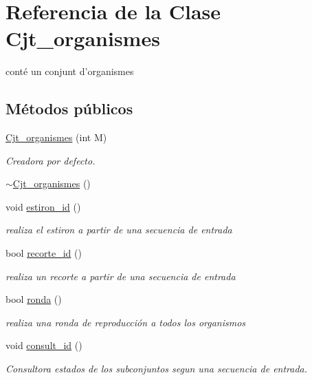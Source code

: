 \hypertarget{class_cjt__organismes}{\section{Referencia de la Clase Cjt\-\_\-organismes}
\label{class_cjt__organismes}
}


conté un conjunt d'organismes  


\subsection*{Métodos públicos}
\begin{DoxyCompactItemize}
\item 
\hyperlink{class_cjt__organismes_aeef5a3310bf21961ed1976585c531a75}{Cjt\-\_\-organismes} (int M)
\begin{DoxyCompactList}\small\item\em Creadora por defecto. \end{DoxyCompactList}\item 
\hyperlink{class_cjt__organismes_ae4c9a822f84e06f17f3e58c0747fd2ff}{$\sim$\-Cjt\-\_\-organismes} ()
\item 
void \hyperlink{class_cjt__organismes_a32f1d55b2e11f6f724e22f305712d3a1}{estiron\-\_\-id} ()
\begin{DoxyCompactList}\small\item\em realiza el estiron a partir de una secuencia de entrada \end{DoxyCompactList}\item 
bool \hyperlink{class_cjt__organismes_a33b52c7d797c0ee244e3c77cb4d2b86e}{recorte\-\_\-id} ()
\begin{DoxyCompactList}\small\item\em realiza un recorte a partir de una secuencia de entrada \end{DoxyCompactList}\item 
bool \hyperlink{class_cjt__organismes_ab6061ae3fc10ae709a2584335e687271}{ronda} ()
\begin{DoxyCompactList}\small\item\em realiza una ronda de reproducción a todos los organismos \end{DoxyCompactList}\item 
void \hyperlink{class_cjt__organismes_a0c8bed8ae75e0d8ff377be4ca1ee05bc}{consult\-\_\-id} ()
\begin{DoxyCompactList}\small\item\em Consultora estados de los subconjuntos segun una secuencia de entrada. \end{DoxyCompactList}\item 

\end{DoxyCompactItemize}
